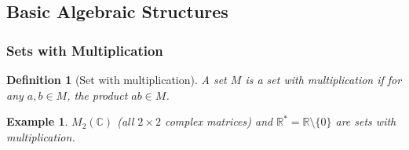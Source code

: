 \documentclass{article}
\newtheorem{definition}{Definition}
\newtheorem*{example}{Example}
\begin{document}
\subsection{Basic Algebraic Structures}

\subsubsection{Sets with Multiplication}
\begin{definition}[Set with multiplication]
    A set $M$ is a set with multiplication if for any $a,b \in M$, the product $ab \in M$.
\end{definition}
\begin{example}
    $M_2(\mathbb{C})$ (all $2\times 2$ complex matrices) and $\mathbb{R}^* = \mathbb{R}\setminus\{0\}$ are sets with multiplication.
\end{example}
\end{document}
